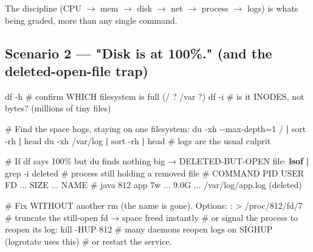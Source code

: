 \documentclass[11pt]{article}
\newenvironment{Shaded}{\begin{snugshade}}{\end{snugshade}}
\newcommand{\AttributeTok}[1]{\textcolor[rgb]{0.16,0.50,0.73}{#1}}
\newcommand{\BuiltInTok}[1]{\textcolor[rgb]{0.50,0.55,0.55}{#1}}
\newcommand{\CommentTok}[1]{\textcolor[rgb]{0.48,0.49,0.49}{#1}}
\newcommand{\ExtensionTok}[1]{\textcolor[rgb]{0.00,0.60,1.00}{\textbf{#1}}}
\newcommand{\FunctionTok}[1]{\textcolor[rgb]{0.56,0.27,0.68}{#1}}
\newcommand{\KeywordTok}[1]{\textcolor[rgb]{0.81,0.81,0.76}{\textbf{#1}}}
\newcommand{\NormalTok}[1]{\textcolor[rgb]{0.81,0.81,0.76}{#1}}
\newcommand{\OperatorTok}[1]{\textcolor[rgb]{0.81,0.81,0.76}{#1}}
\begin{document}
The discipline (CPU \(\rightarrow\) mem \(\rightarrow\) disk \(\rightarrow\) net \(\rightarrow\) process \(\rightarrow\) logs) is what\textquotesingle s being graded, more than any single command.

\subsection{Scenario 2 --- "Disk is at 100\%." (and the deleted-open-file trap)}\label{scenario-2--disk-is-at-100-and-the-deleted-open-file-trap}


\begin{Shaded}
\begin{Highlighting}[]
\FunctionTok{df} \AttributeTok{{-}h}                          \CommentTok{\# confirm WHICH filesystem is full (/ ? /var ?)}
\FunctionTok{df} \AttributeTok{{-}i}                          \CommentTok{\# is it INODES, not bytes? (millions of tiny files)}

\CommentTok{\# Find the space hogs, staying on one filesystem:}
\FunctionTok{du} \AttributeTok{{-}xh} \AttributeTok{{-}{-}max{-}depth}\OperatorTok{=}\NormalTok{1 / }\KeywordTok{|} \FunctionTok{sort} \AttributeTok{{-}rh} \KeywordTok{|} \FunctionTok{head}
\FunctionTok{du} \AttributeTok{{-}xh}\NormalTok{ /var/log }\KeywordTok{|} \FunctionTok{sort} \AttributeTok{{-}rh} \KeywordTok{|} \FunctionTok{head}        \CommentTok{\# logs are the usual culprit}

\CommentTok{\# If df says 100\% but du finds nothing big → DELETED{-}BUT{-}OPEN file:}
\ExtensionTok{lsof} \KeywordTok{|} \FunctionTok{grep} \AttributeTok{{-}i}\NormalTok{ deleted                   }\CommentTok{\# process still holding a removed file}
\CommentTok{\#   COMMAND  PID  USER  FD  ...  SIZE  ...  NAME}
\CommentTok{\#   java     812  app   7w  ...  9.0G  ...  /var/log/app.log (deleted)}

\CommentTok{\# Fix WITHOUT another rm (the name is gone). Options:}
\BuiltInTok{:} \OperatorTok{\textgreater{}}\NormalTok{ /proc/812/fd/7             }\CommentTok{\# truncate the still{-}open fd → space freed instantly}
\CommentTok{\# or signal the process to reopen its log:}
\BuiltInTok{kill} \AttributeTok{{-}HUP}\NormalTok{ 812                  }\CommentTok{\# many daemons reopen logs on SIGHUP (logrotate uses this)}
\CommentTok{\# or restart the service.}
\end{Highlighting}
\end{Shaded}
\end{document}
